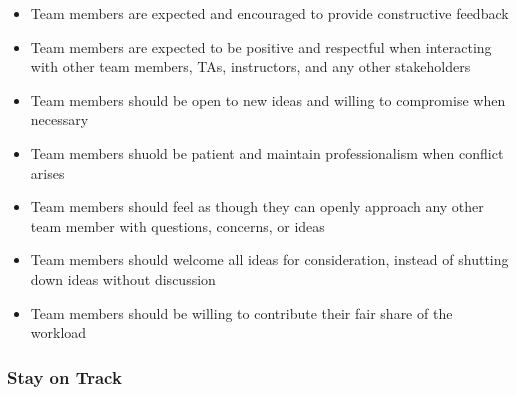 \documentclass{article}
\begin{document}
\begin{itemize}
  \item Team members are expected and encouraged to provide constructive feedback
  \item Team members are expected to be positive and respectful when interacting 
  with other team members, TAs, instructors, and any other stakeholders
  \item Team members should be open to new ideas and willing to compromise 
  when necessary
  \item Team members shuold be patient and maintain professionalism when conflict 
  arises
  \item Team members should feel as though they can openly approach any other team member 
  with questions, concerns, or ideas
  \item Team members should welcome all ideas for consideration, instead of shutting 
  down ideas without discussion
  \item Team members should be willing to contribute their fair share of the workload
\end{itemize}


\subsubsection*{Stay on Track}
\end{document}
